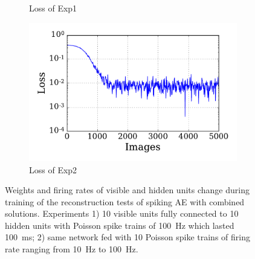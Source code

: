 \begin{figure}
\begin{subfigure}[t]{0.48\textwidth}
		\caption{Loss of Exp1}
	\end{subfigure}
	\begin{subfigure}[t]{0.48\textwidth}
		\includegraphics[width=\textwidth]{pics_sdlm/07_exp_SAE_all_long/exp2_mse_nons.pdf}
		\caption{Loss of Exp2}
	\end{subfigure}
	\caption[SAE-S4 training of the reconstruction tests.]{Weights and firing rates of visible and hidden units change during training of the reconstruction tests of spiking AE with combined solutions. 
		Experiments 1) 10 visible units fully connected to 10 hidden units with Poisson spike trains of 100~Hz which lasted 100~ms; 2) same network fed with 10 Poisson spike trains of firing rate ranging from 10~Hz to 100~Hz.}
	\label{fig:sol4_ae}
\end{figure}


